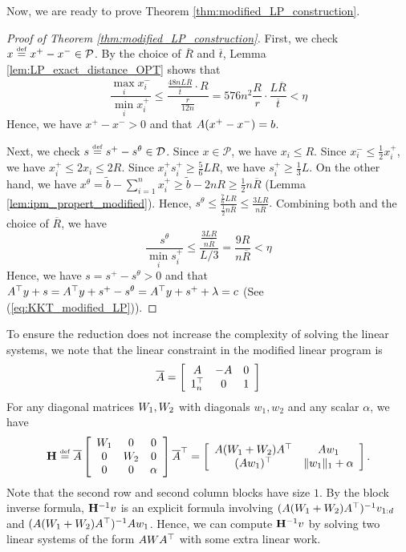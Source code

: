 Now, we are ready to prove Theorem \ref{thm:modified_LP_construction}.
\begin{proof}[Proof of Theorem \ref{thm:modified_LP_construction}]
First, we check $x\stackrel{\mathrm{{\scriptscriptstyle def}}}{=} x^{+}-x^{-}\in\mathcal{P}$. By the choice of
$\overline{R}$ and $\overline{t}$, Lemma \ref{lem:LP_exact_distance_OPT}
shows that 
\[
\frac{\max_{i}x^{-}_{i}}{\min_{i}x^{+}_{i}}\leq\frac{\frac{48nL\overline{R}}{\overline{t}}\cdot R}{\frac{r}{12n}}=576n^{2}\frac{R}{r}\cdot\frac{L\overline{R}}{\overline{t}}<\eta
\]
Hence, we have $x^{+}-x^{-}>0$ and that $A(x^{+}-x^{-})=b$. 

Next, we check $s\stackrel{\mathrm{{\scriptscriptstyle def}}}{=} s^{+}-s^{\theta}\in\mathcal{D}$. Since $x\in\mathcal{P}$,
we have $x_{i}\leq R$. Since $x^{-}_{i}\leq\frac{1}{2}x^{+}_{i}$,
we have $x^{+}_{i}\leq2x_{i}\leq2R$. Since $x^{+}_{i}s^{+}_{i}\geq\frac{5}{6}LR$,
we have $s^{+}_{i}\geq\frac{1}{3}L.$ On the other hand, we have $x^{\theta}=\widetilde{b}-\sum^{n}_{i=1}x^{+}_{i}\geq\widetilde{b}-2nR\geq\frac{1}{2}n\overline{R}$
(Lemma \ref{lem:ipm_propert_modified}). Hence, $s^{\theta}\leq\frac{\frac{7}{6}LR}{\frac{1}{2}n\overline{R}}\leq\frac{3LR}{n\overline{R}}.$
Combining both and the choice of $\overline{R}$, we have
\[
\frac{s^{\theta}}{\min_{i}s^{+}_{i}}\leq\frac{\frac{3LR}{n\overline{R}}}{L/3}=\frac{9R}{n\overline{R}}<\eta
\]
Hence, we have $s=s^{+}-s^{\theta}>0$ and that $A^{\top}y+s=A^{\top}y+s^{+}-s^{\theta}=A^{\top}y+s^{+}+\lambda=c$
(See (\ref{eq:KKT_modified_LP})).
\end{proof}
To ensure the reduction does not increase the complexity of solving
the linear systems, we note that the linear constraint in the modified
linear program is
\[
\overline{A}=\left[\begin{array}{ccc}
A & -A & 0\\
1^{\top}_{n} & 0 & 1
\end{array}\right]
\]
For any diagonal matrices $W_{1},W_{2}$ with diagonals $w_{1},w_{2}$
and any scalar $\alpha$, we have
\[
\mathbf{H}\stackrel{\mathrm{{\scriptscriptstyle def}}}{=}\overline{A}\left[\begin{array}{ccc}
W_{1} & 0 & 0\\
0 & W_{2} & 0\\
0 & 0 & \alpha
\end{array}\right]\overline{A}^{\top}=\left[\begin{array}{cc}
A(W_{1}+W_{2})A^{\top} & A w_{1}\\
(A w_{1})^{\top} & \|w_{1}\|_{1}+\alpha
\end{array}\right].
\]
Note that the second row and second column blocks have size $1$.
By the block inverse formula, $\mathbf{H}^{-1}v$ is an explicit formula
involving $(A(W_{1}+W_{2})A^{\top})^{-1}v_{1:d}$ and $(A(W_{1}+W_{2})A^{\top})^{-1}A w_{1}$.
Hence, we can compute $\mathbf{H}^{-1}v$ by solving two linear systems of
the form $AWA^{\top}$ with some extra linear work.

